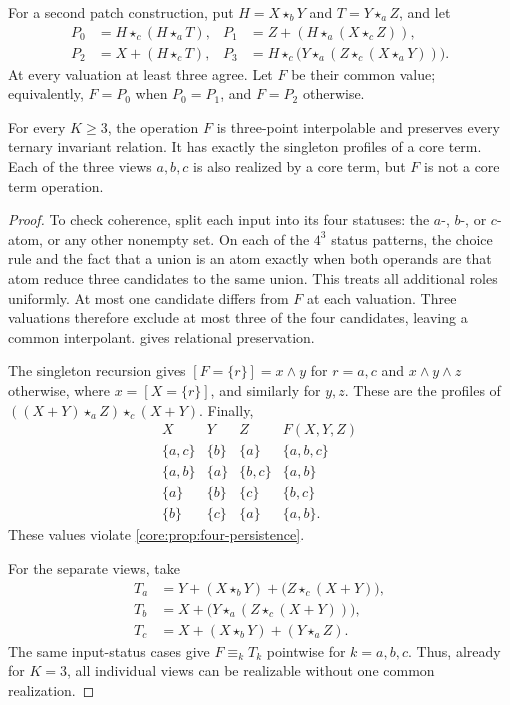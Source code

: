 For a second patch construction, put $H=X\star_bY$ and $T=Y\star_aZ$, and let
\[
\begin{aligned}
 P_0&=H\star_c(H\star_aT),&
 P_1&=Z+(H\star_a(X\star_cZ)),\\
 P_2&=X+(H\star_cT),&
 P_3&=H\star_c\bigl(Y\star_a(Z\star_c(X\star_aY))\bigr).
\end{aligned}
\]
At every valuation at least three agree. Let $F$ be their common value;
equivalently, $F=P_0$ when $P_0=P_1$, and $F=P_2$ otherwise.

\begin{theorem}\label{core:thm:ternary-obstruction}
For every $K\geq3$, the operation $F$ is three-point interpolable and
preserves every ternary invariant relation. It has exactly the singleton
profiles of a core term. Each of the three views $a,b,c$ is also
realized by a core term, but $F$ is not a core term operation.
\end{theorem}
\begin{proof}
To check coherence, split each input into its four statuses: the $a$-,
$b$-, or $c$-atom, or any other nonempty set. On each of the $4^3$ status
patterns, the choice rule and the fact that a union is an atom exactly
when both operands are that atom reduce three candidates to the same
union. This treats all additional roles uniformly.
At most one candidate differs from $F$ at each valuation. Three
valuations therefore exclude at most three of the four candidates,
leaving a common interpolant. 
gives relational preservation.

The singleton recursion gives $[F=\{r\}]=x\land y$ for $r=a,c$ and
$x\land y\land z$ otherwise, where $x=[X=\{r\}]$, and similarly for
$y,z$. These are the profiles of $((X+Y)\star_aZ)\star_c(X+Y)$.
Finally,
\[
\begin{array}{c|c|c|c}
 X&Y&Z&F(X,Y,Z)\\\hline
 \{a,c\}&\{b\}&\{a\}&\{a,b,c\}\\
 \{a,b\}&\{a\}&\{b,c\}&\{a,b\}\\
 \{a\}&\{b\}&\{c\}&\{b,c\}\\
 \{b\}&\{c\}&\{a\}&\{a,b\}.
\end{array}
\]
These values violate \cref{core:prop:four-persistence}.

For the separate views, take
\[
\begin{aligned}
 T_a&=Y+(X\star_bY)+\bigl(Z\star_c(X+Y)\bigr),\\
 T_b&=X+\bigl(Y\star_a(Z\star_c(X+Y))\bigr),\\
 T_c&=X+(X\star_bY)+(Y\star_aZ).
\end{aligned}
\]
The same input-status cases give $F\equiv_k T_k$ pointwise for $k=a,b,c$.
Thus, already for $K=3$, all individual views can be realizable without
one common realization.
\end{proof}

